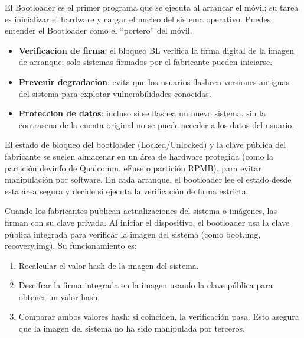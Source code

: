 


El Bootloader es el primer programa que se ejecuta al arrancar el móvil; su tarea es inicializar el hardware y cargar el nucleo del sistema operativo. Puedes entender el Bootloader como el “portero” del móvil.


\begin{itemize}
  \item \textbf{Verificacion de firma}: el bloqueo BL verifica la firma digital de la imagen de arranque; solo sistemas firmados por el fabricante pueden iniciarse.
  \item \textbf{Prevenir degradacion}: evita que los usuarios flasheen versiones antiguas del sistema para explotar vulnerabilidades conocidas.
  \item \textbf{Proteccion de datos}: incluso si se flashea un nuevo sistema, sin la contrasena de la cuenta original no se puede acceder a los datos del usuario.
\end{itemize}


El estado de bloqueo del bootloader (Locked/Unlocked) y la clave pública del fabricante se suelen almacenar en un área de hardware protegida (como la partición devinfo de Qualcomm, eFuse o partición RPMB), para evitar manipulación por software. En cada arranque, el bootloader lee el estado desde esta área segura y decide si ejecuta la verificación de firma estricta.


Cuando los fabricantes publican actualizaciones del sistema o imágenes, las firman con su clave privada. Al iniciar el dispositivo, el bootloader usa la clave pública integrada para verificar la imagen del sistema (como boot.img, recovery.img). Su funcionamiento es:

\begin{enumerate}
  \item Recalcular el valor hash de la imagen del sistema.
  \item Descifrar la firma integrada en la imagen usando la clave pública para obtener un valor hash.
  \item Comparar ambos valores hash; si coinciden, la verificación pasa. Esto asegura que la imagen del sistema no ha sido manipulada por terceros.
\end{enumerate}

